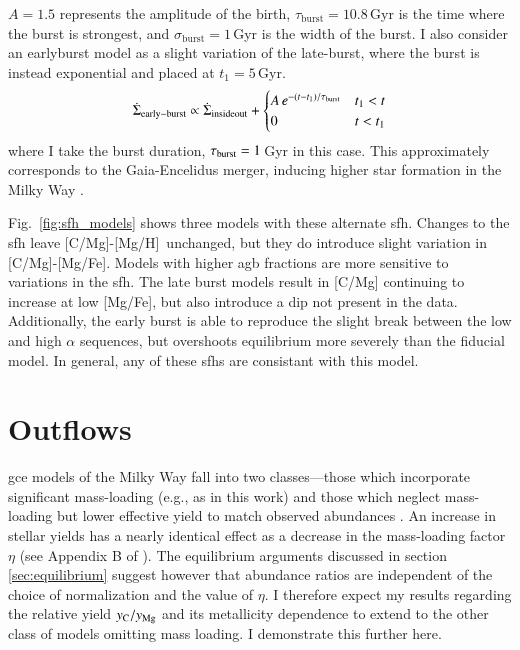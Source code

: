 \documentclass[12pt,oneside,letterpaper]{report}
\newcommand{\agb}{\gls{agb}}
\newcommand{\sfh}{\gls{sfh}}
\newcommand{\gce}{\gls{gce}}
\newcommand{\caah}{[C/Mg]-[Mg/H]}
\newcommand{\caafe}{[C/Mg]-[Mg/Fe]}
\begin{document}
$A=1.5$ represents the amplitude of the birth, $\tau_\text{burst}=10.8$\,Gyr is the time where the burst is strongest, and $\sigma_\text{burst}=1$\,Gyr is the width of the burst.
I also consider an earlyburst model as a slight variation of the late-burst, where the burst is instead exponential and placed at $t_1=5$\,Gyr. 
\begin{equation}\label{eq:twoinfall}
    \dot{\Sigma}_{\rm early-burst} \propto \dot{\Sigma}_{\rm insideout} + 
\begin{cases}
    A\,e^{-(t-t_1)/\tau_{\rm burst}} & t_1 < t \\
      0 & t<t_1
\end{cases}
\end{equation}
where I take the burst duration, $\tau_{\rm burst}=1$\,Gyr in this case. 
This approximately corresponds to the Gaia-Encelidus merger, inducing higher star formation in the Milky Way \citep{spitoni21, bonaca20, helmi18}.

Fig.~\ref{fig:sfh_models} shows three models with these alternate \sfh{}. Changes to the \sfh{} leave \caah\ unchanged, but they do introduce slight variation in \caafe. Models with higher \agb{} fractions are more sensitive to variations in the \sfh{}. The late burst models result in [C/Mg] continuing to increase at low [Mg/Fe], but also introduce a dip not present in the data. Additionally, the early burst
is able to reproduce the slight break between the low and high $\alpha$ sequences, but overshoots equilibrium more severely than the fiducial model. 
In general, any of these \sfh{}s are consistant with this model.

\section{Outflows} \label{sec:outflows}

\gce{} models of the Milky Way fall into two classes---those which incorporate significant mass-loading (e.g., as in this work) and those which neglect mass-loading but lower effective yield to match observed abundances \citep[e.g.][]{MCM13, MCM14, spitoni19, spitoni20, spitoni21}.
An increase in stellar yields has a nearly identical effect as a decrease in the mass-loading factor $\eta$ (see Appendix B of \citealt{james_dwarf}).
The equilibrium arguments discussed in section \ref{sec:equilibrium} suggest however that abundance ratios are independent of the choice of normalization and the value of $\eta$. I therefore expect my results regarding the relative yield $y_{\rm C}/y_{\rm Mg}$ and its metallicity dependence to extend to the other class of models omitting mass loading. I demonstrate this further here.
\end{document}
